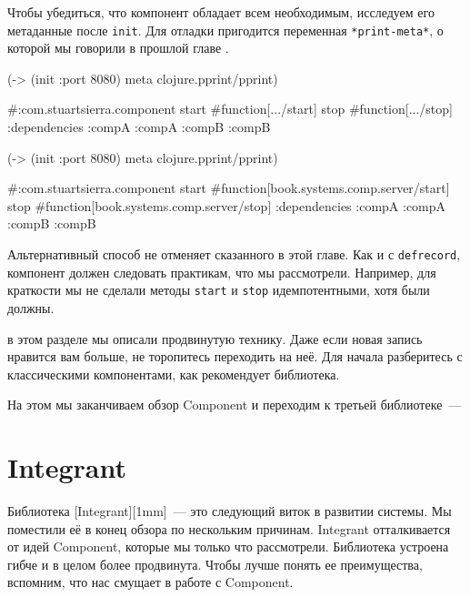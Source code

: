 \fi

Чтобы убедиться, что компонент обладает всем необходимым, исследуем его
метаданные после \verb|init|. Для отладки пригодится переменная
\verb|*print-meta*|, о которой мы говорили в прошлой главе .

\ifx\DEVICETYPE\MOBILE

\begin{english}
  \begin{clojure}
(-> (init {:port 8080})
    meta
    clojure.pprint/pprint)

#:com.stuartsierra.component
 {start #function[.../start]
  stop  #function[.../stop]
  :dependencies
  {:compA :compA :compB :compB}}
  \end{clojure}
\end{english}

\else

\begin{english}
  \begin{clojure}
(-> (init {:port 8080})
    meta
    clojure.pprint/pprint)

#:com.stuartsierra.component
  {start #function[book.systems.comp.server/start]
   stop #function[book.systems.comp.server/stop]
   :dependencies {:compA :compA :compB :compB}}
  \end{clojure}
\end{english}

\fi


Альтернативный способ не отменяет сказанного в этой главе. Как и с
\verb|defrecord|, компонент должен следовать практикам, что мы
рассмотрели. Например, для краткости мы не сделали методы \verb|start| и
\verb|stop| идемпотентными, хотя были должны.

в этом разделе мы описали продвинутую технику. Даже если новая запись нравится
вам больше, не торопитесь переходить на неё. Для начала разберитесь с
классическими компонентами, как рекомендует библиотека.

На этом мы заканчиваем обзор Component и переходим к третьей библиотеке~---

\section{Integrant}


Библиотека [Integrant][1mm]~--- это
следующий виток в развитии системы. Мы поместили её в конец обзора по нескольким
причинам. Integrant отталкивается от идей Component, которые мы только что
рассмотрели. Библиотека устроена гибче и в целом более продвинута. Чтобы лучше
понять ее преимущества, вспомним, что нас смущает в работе с Component.

